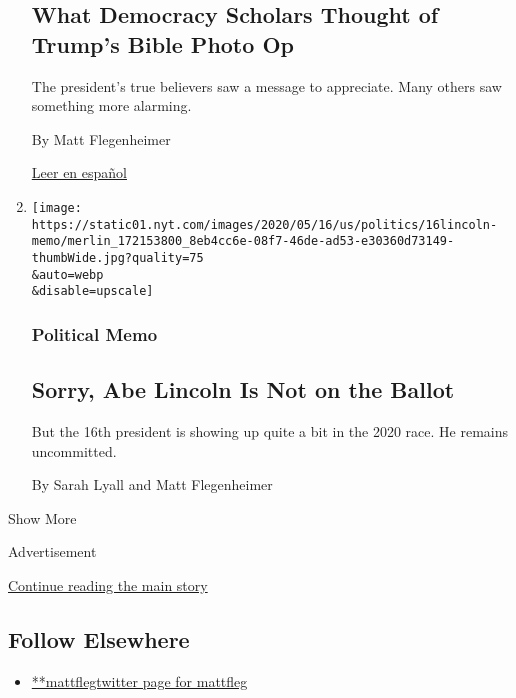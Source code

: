 \begin{enumerate}
  \hypertarget{what-democracy-scholars-thought-of-trumps-bible-photo-op}{%
  \subsection{What Democracy Scholars Thought of Trump's Bible Photo
  Op}\label{what-democracy-scholars-thought-of-trumps-bible-photo-op}}

  The president's true believers saw a message to appreciate. Many
  others saw something more alarming.

  By Matt Flegenheimer

  \href{https://www.nytimes.com/es/2020/06/04/espanol/mundo/trump-biblia.html}{Leer
  en español}
\item
  \href{/2020/05/16/us/politics/abraham-lincoln-trump-biden.html}{}

  \texttt{[image: https://static01.nyt.com/images/2020/05/16/us/politics/16lincoln-memo/merlin\_172153800\_8eb4cc6e-08f7-46de-ad53-e30360d73149-thumbWide.jpg?quality=75\\\&auto=webp\\\&disable=upscale]}

  \hypertarget{political-memo-1}{%
  \subsubsection{Political Memo}\label{political-memo-1}}

  \hypertarget{sorry-abe-lincoln-is-not-on-the-ballot}{%
  \subsection{Sorry, Abe Lincoln Is Not on the
  Ballot}\label{sorry-abe-lincoln-is-not-on-the-ballot}}

  But the 16th president is showing up quite a bit in the 2020 race. He
  remains uncommitted.

  By Sarah Lyall and Matt Flegenheimer
\end{enumerate}

Show More

Advertisement

\protect\hyperlink{after-mid2}{Continue reading the main story}

\hypertarget{follow-elsewhere}{%
\subsection{Follow Elsewhere}\label{follow-elsewhere}}

\begin{itemize}
\tightlist
\item
  \href{https://twitter.com/mattfleg}{**mattflegtwitter page for
  mattfleg}
\end{itemize}

